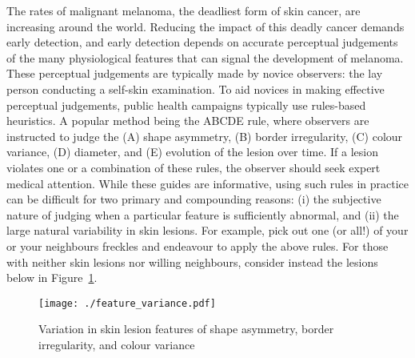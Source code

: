 \documentclass[man, 12pt, a4paper,  donotrepeattitle, floatsintext, draftfirst]{apa7}
\begin{document}
\newpage
{}
\setcounter{page}{1}
The rates of malignant melanoma, the deadliest form of skin cancer, are increasing around the world.
Reducing the impact of this deadly cancer demands early detection, and early detection depends on accurate perceptual judgements of the many physiological features that can signal the development of melanoma.
These perceptual judgements are typically made by novice observers: the lay person conducting a self-skin examination.
To aid novices in making effective perceptual judgements, public health campaigns typically use rules-based heuristics.
A popular method being the ABCDE rule, where observers are instructed to judge the (A) shape asymmetry, (B) border irregularity, (C) colour variance, (D) diameter, and (E) evolution of the lesion over time.
If a lesion violates one or a combination of these rules, the observer should seek expert medical attention.
While these guides are informative, using such rules in practice can be difficult for two primary and compounding reasons:
(i) the subjective nature of judging when a particular feature is sufficiently abnormal, and
(ii) the large natural variability in skin lesions.
For example, pick out one (or all!) of your or your neighbours freckles and endeavour to apply the above rules.
For those with neither skin lesions nor willing neighbours, consider instead the lesions below in Figure~\ref{fig:feature_variance}.

\begin{figure}[htb]
    \caption[ABC feature variance]{Variation in skin lesion features of shape asymmetry, border irregularity, and colour variance}
    \centering
    \texttt{[image: ./feature\_variance.pdf]}
    \label{fig:feature_variance}
\end{figure}
\end{document}
